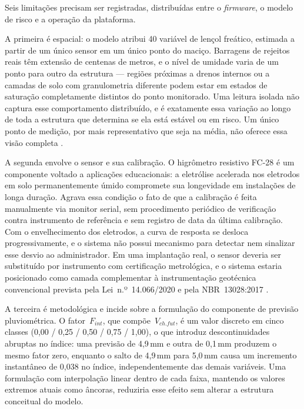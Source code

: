 Seis limitações precisam ser registradas, distribuídas entre o
\textit{firmware}, o modelo de risco e a operação da plataforma.

A primeira é espacial: o modelo atribui 40%
variável de lençol freático, estimada a partir de um único sensor em
um único ponto do maciço. Barragens de rejeitos reais têm extensão de
centenas de metros, e o nível de umidade varia de um ponto para outro
da estrutura --- regiões próximas a drenos internos ou a camadas de
solo com granulometria diferente podem estar em estados de saturação
completamente distintos do ponto monitorado. Uma leitura isolada não
captura esse comportamento distribuído, e é exatamente essa variação ao
longo de toda a estrutura que determina se ela está estável ou em risco.
Um único ponto de medição, por mais representativo que seja na média,
não oferece essa visão completa \cite{rico2008mine}.

A segunda envolve o sensor e sua calibração. O higrômetro resistivo
FC-28 é um componente voltado a aplicações educacionais: a eletrólise
acelerada nos eletrodos em solo permanentemente úmido compromete sua
longevidade em instalações de longa duração. Agrava essa condição o
fato de que a calibração é feita manualmente via monitor serial, sem
procedimento periódico de verificação contra instrumento de referência
e sem registro de data da última calibração. Com o envelhecimento dos
eletrodos, a curva de resposta se desloca progressivamente, e o sistema
não possui mecanismo para detectar nem sinalizar esse desvio ao
administrador. Em uma implantação real, o sensor deveria ser substituído
por instrumento com certificação metrológica, e o sistema estaria
posicionado como camada complementar à instrumentação geotécnica
convencional prevista pela Lei~n.º~14.066/2020 e pela
NBR~13028:2017 \cite{brasil2020lei14066, abnt2017}.

A terceira é metodológica e incide sobre a formulação do componente de
previsão pluviométrica. O fator~$F_{int}$, que compõe~$V_{ch.fut}$,
é um valor discreto em cinco classes (0,00 / 0,25 / 0,50 / 0,75 /
1,00), o que introduz descontinuidades abruptas no índice: uma previsão
de 4,9\,mm e outra de 0,1\,mm produzem o mesmo fator zero, enquanto
o salto de 4,9\,mm para 5,0\,mm causa um incremento instantâneo de
0,038 no índice, independentemente das demais variáveis. Uma formulação
com interpolação linear dentro de cada faixa, mantendo os valores
extremos atuais como âncoras, reduziria esse efeito sem alterar a
estrutura conceitual do modelo.


